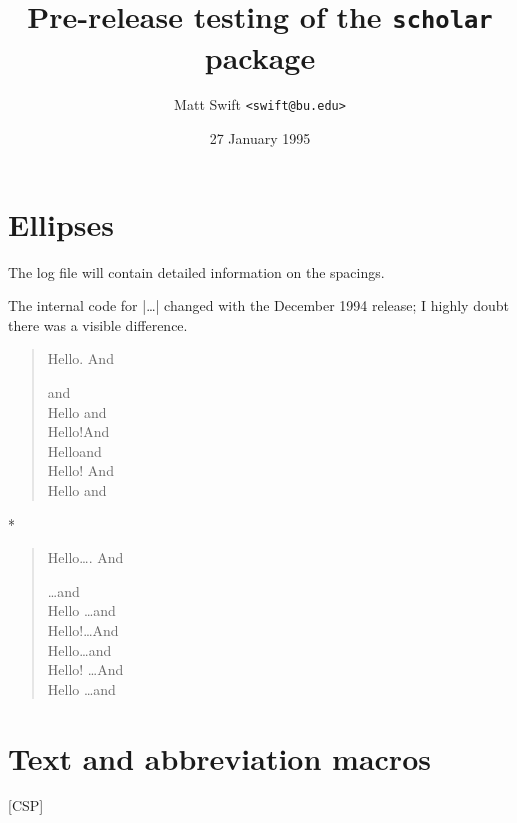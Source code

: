 \documentclass{article}
\makeatletter
\newcommand\debug[1]
  {\tracingoutput\@ne
  \tracingpages\@ne
  \tracingmacros#1  
  \tracingcommands#1
  \showboxbreadth\@M
  \showboxdepth\@M}
\makeatother
\begin{document}

\author{Matt Swift \texttt{<swift@bu.edu>}}
\date{27 January 1995}
\title{Pre-release testing of the \texttt{scholar} package}
\maketitle


\section{Ellipses}
The log file will contain detailed information on the spacings.

The internal code for |\ldots| changed with the December 1994 release;
I highly doubt there was a visible difference.
\begin{quote}
 \debug1
   Hello\lips. And

   \lips and \\
   Hello \lips and \\
   Hello!\lips And  \\  %
   Hello\lips and \\
   Hello! \lips And \\  %
   Hello \lips and
 \debug0
\end{quote}
\begin{center}
*\quad*\quad*
\end{center}
\begin{quote} \let\lips\ldots
 \debug1
   Hello\lips. And

   \lips and \\
   Hello \lips and \\
   Hello!\lips And  \\  %
   Hello\lips and \\
   Hello! \lips And \\  %
   Hello \lips and
 \debug0
\end{quote}

\section{Text and abbreviation macros}
[CSP]
\end{document}
